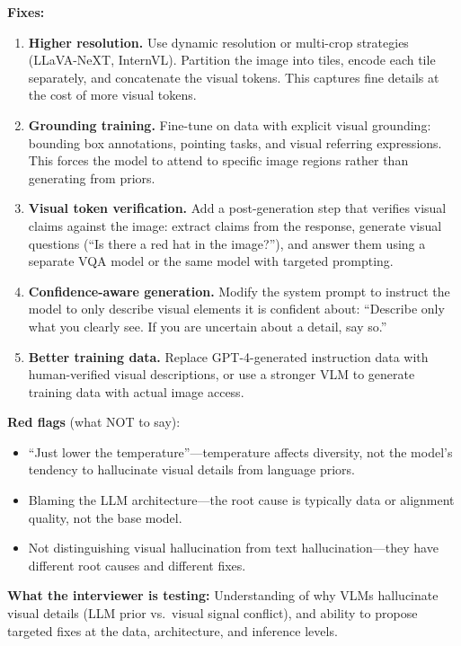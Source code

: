 \begin{interviewq}
\textbf{Fixes:}
\begin{enumerate}
    \item \textbf{Higher resolution.} Use dynamic resolution or multi-crop strategies (LLaVA-NeXT, InternVL). Partition the image into tiles, encode each tile separately, and concatenate the visual tokens. This captures fine details at the cost of more visual tokens.
    \item \textbf{Grounding training.} Fine-tune on data with explicit visual grounding: bounding box annotations, pointing tasks, and visual referring expressions. This forces the model to attend to specific image regions rather than generating from priors.
    \item \textbf{Visual token verification.} Add a post-generation step that verifies visual claims against the image: extract claims from the response, generate visual questions (``Is there a red hat in the image?''), and answer them using a separate VQA model or the same model with targeted prompting.
    \item \textbf{Confidence-aware generation.} Modify the system prompt to instruct the model to only describe visual elements it is confident about: ``Describe only what you clearly see. If you are uncertain about a detail, say so.''
    \item \textbf{Better training data.} Replace GPT-4-generated instruction data with human-verified visual descriptions, or use a stronger VLM to generate training data with actual image access.
\end{enumerate}

\textbf{Red flags} (what NOT to say):
\begin{itemize}
    \item ``Just lower the temperature''---temperature affects diversity, not the model's tendency to hallucinate visual details from language priors.
    \item Blaming the LLM architecture---the root cause is typically data or alignment quality, not the base model.
    \item Not distinguishing visual hallucination from text hallucination---they have different root causes and different fixes.
\end{itemize}

\textbf{What the interviewer is testing:} Understanding of why VLMs hallucinate visual details (LLM prior vs.\ visual signal conflict), and ability to propose targeted fixes at the data, architecture, and inference levels.


\end{interviewq}
